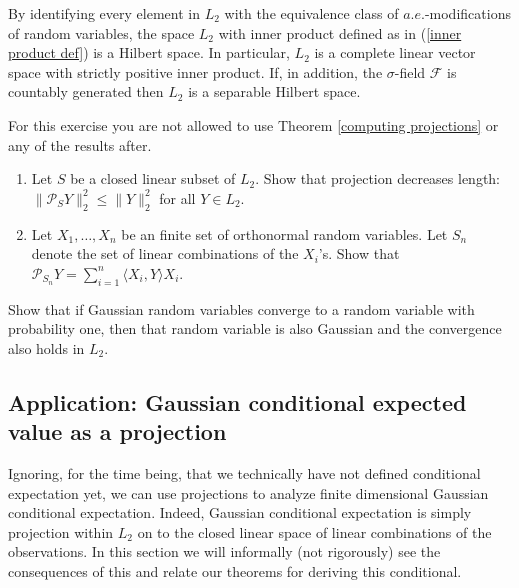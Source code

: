 \begin{theorem}
By identifying every element in $L_2$ with the equivalence class of  $a.e.$-modifications of random variables, the space $L_2$ with inner product defined as in (\ref{inner product def}) is a Hilbert space.
In particular, $L_2$ is a complete linear vector space with strictly positive inner product.
If, in addition, the $\sigma$-field $\mathcal F$ is countably generated then $L_2$ is a separable Hilbert space.
\end{theorem}


\begin{exercise}
\label{finite projection}
For this exercise you are not allowed to use Theorem \ref{computing projections} or any of the results after.
\begin{enumerate}
\item Let $S$ be a closed linear subset of $L_2$. Show that projection decreases length:  $\|\mathcal P_S Y \|^2_2 \leq  \| Y \|_2^2$ for all $Y\in L_2$.
\item Let $X_1, \ldots, X_n$ be an finite set of orthonormal random variables. Let $S_n$ denote the set of linear combinations of the $X_i$'s. Show that $\mathcal P_{S_n} Y = \sum_{i=1}^n \langle X_i, Y\rangle X_i$.
\end{enumerate}
\end{exercise}


\begin{exercise}
Show that if Gaussian random variables converge to a random variable with probability one, then that random variable is also Gaussian and the convergence also holds in $L_2$.
\end{exercise}




\subsection{Application: Gaussian conditional expected value as a projection}

Ignoring, for the time being, that we technically have not defined conditional expectation yet, we can use projections to analyze finite dimensional Gaussian conditional expectation. Indeed, Gaussian conditional expectation is simply projection within $L_2$ on to the closed linear space of linear combinations of the observations. In this section we will informally (not rigorously) see the consequences of this and relate our theorems for deriving this conditional.

